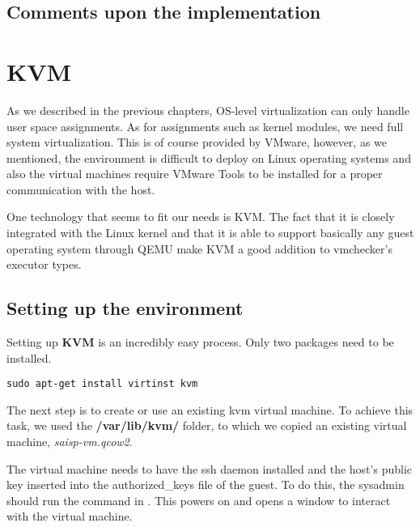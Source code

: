 \subsection{Comments upon the implementation}
\label{sec:vmc-lxc-comments}


\section{KVM}
\label{sec:vmc-kvm}

As we described in the previous chapters, OS-level virtualization can only
handle user space assignments. As for assignments such as kernel modules,
we need full system virtualization. This is of course provided by VMware,
however, as we mentioned, the environment is difficult to deploy on 
Linux operating systems and also the virtual machines require VMware Tools
to be installed for a proper communication with the host.

One technology that seems to fit our needs is KVM. The fact that it is closely
integrated with the Linux kernel and that it is able to support basically
any guest operating system through QEMU make KVM a good addition to vmchecker's 
executor types.

\subsection{Setting up the environment}
\label{sub-sec:vmc-kvm-setup}

Setting up \textbf{KVM} is an incredibly easy process. Only two packages need
to be installed.

\lstset{caption=Install the needed packages, label=lst:kvm-deps}
\begin{lstlisting}
sudo apt-get install virtinst kvm
\end{lstlisting}

The next step is to create or use an existing kvm virtual machine.
To achieve this task, we used the \textbf{/var/lib/kvm/} folder, to which
we copied an existing virtual machine, \textit{saisp-vm.qcow2}.

The virtual machine needs to have the ssh daemon installed and the host's
public key inserted into the authorized_keys file of the guest. To do this,
the sysadmin should run the command in .
This powers on and opens a window to interact with the virtual machine.


